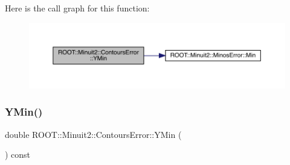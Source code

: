 Here is the call graph for this function\+:
\nopagebreak
\begin{figure}[H]
\begin{center}
\leavevmode
\includegraphics[width=350pt]{d3/de9/classROOT_1_1Minuit2_1_1ContoursError_ac2bd4c328fe62d04b2809d9e0730efe3_cgraph}
\end{center}
\end{figure}
\mbox{\label{classROOT_1_1Minuit2_1_1ContoursError_ac2bd4c328fe62d04b2809d9e0730efe3}} 
\subsubsection{\texorpdfstring{YMin()}{YMin()}\hspace{0.1cm}{\footnotesize\ttfamily [2/2]}}
{\footnotesize\ttfamily double R\+O\+O\+T\+::\+Minuit2\+::\+Contours\+Error\+::\+Y\+Min (\begin{DoxyParamCaption}{ }\end{DoxyParamCaption}) const\hspace{0.3cm}{\ttfamily [inline]}}

